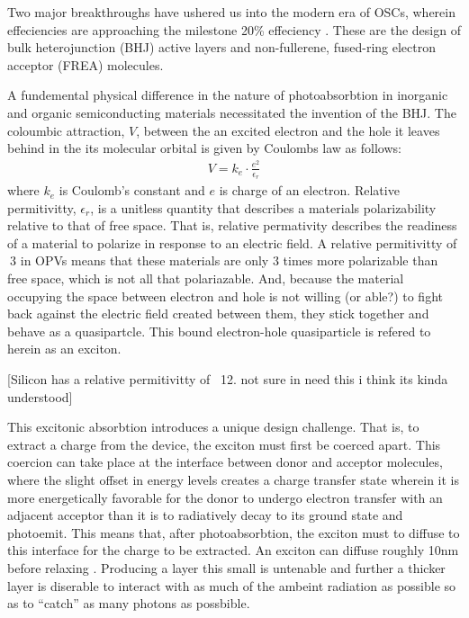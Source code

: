 Two major breakthroughs have ushered us into the modern era of OSCs,
wherein effeciencies are approaching the milestone 20\% effeciency \cite{Liu2020b}.
These are the design of bulk heterojunction (BHJ) active layers and non-fullerene, fused-ring electron
acceptor (FREA) molecules. 

A fundemental physical difference in the nature of photoabsorbtion in inorganic and organic 
semiconducting materials necessitated the
invention of the BHJ. The coloumbic attraction, $V$, between the an excited
electron and the hole it leaves behind in the its molecular orbital
is given by Coulombs law as follows:
\begin{align}
    \label{coulomb}
    V  =  k_{e} \cdot \frac{e^{2}}{\epsilon_{r}}
\end{align}
where $k_{e}$ is Coulomb's constant and $e$ is charge of an electron. Relative permitivitty,
$\epsilon_{r}$, is a unitless quantity that describes a materials polarizability relative
to that of free space. That is, relative
permativity describes the readiness of a material
to polarize in response to an electric field. A
relative permitivitty of $~3$ in OPVs means that these materials are only $3$ times more polarizable than free space, which
is not all that polariazable. And, because the material occupying the space between electron and hole
is not willing (or able?) to fight back against the electric field created between them, they stick together and behave as a quasipartcle. 
This bound electron-hole quasiparticle is refered to herein as an exciton.

[Silicon has a relative permitivitty of ~12. not sure in need this i think its kinda understood]

This excitonic absorbtion introduces a unique design challenge.
That is, to extract a charge from the device, the exciton
must first be coerced apart. This coercion can take place at the interface between donor and acceptor molecules,
where the slight offset in energy levels creates a charge transfer state wherein it is more
energetically favorable for the donor to undergo electron transfer with an adjacent acceptor than
it is to radiatively decay to its ground state and photoemit.
This means that, after photoabsorbtion, the exciton must to diffuse to this interface for the charge to be
extracted. An exciton can diffuse roughly 10nm before relaxing \cite{clarke2010}. 
Producing a layer this small is untenable and further a thicker layer
is diserable to interact with as much of the ambeint radiation as possible so as to ``catch'' as many photons
as possbible. 

